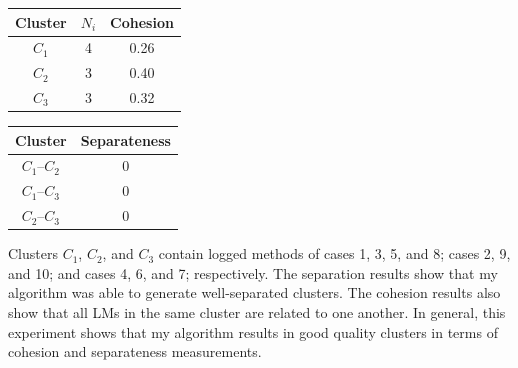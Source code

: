 \begin{minipage}[b]{.40\textwidth}
   \centering
   \begin{tabular}{ ccc}\toprule
     {Cluster}&{$N_i$}&{Cohesion}\\
    \toprule
    $C_1$&4& 0.26 \\
    \midrule
    $C_2$&3& 0.40\\
    \midrule
    $C_3$&3& 0.32\\
 	\bottomrule
   \end{tabular}
   \label{tab:cohesion}
\end{minipage}\qquad
\begin{minipage}[b]{.40\textwidth}
   \centering
   \begin{tabular}{ cc}\toprule
     {Cluster}&{Separateness}\\
    \toprule
    $C_1$--$C_2$& 0\\
    \midrule
    $C_1$--$C_3$& 0\\
    \midrule
    $C_2$--$C_3$& 0\\
 	\bottomrule
   \end{tabular}
   \label{tab:separateness}

\end{minipage}


Clusters $C_1$, $C_2$, and $C_3$ contain logged methods of cases 1, 3, 5, and 8; cases 2, 9, and 10; and cases 4, 6, and 7; respectively.
The separation results show that my algorithm was able to generate well-separated clusters.
The cohesion results also show that all LMs in the same cluster are related to one another. In general, this experiment shows that my algorithm results in good quality clusters in terms of cohesion and separateness measurements.



